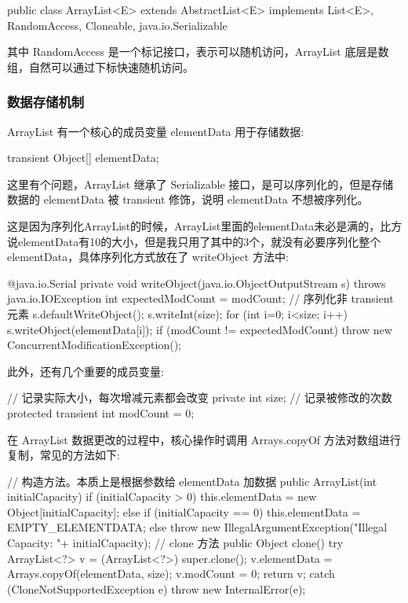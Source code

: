 \begin{Java}
public class ArrayList<E> extends AbstractList<E> implements List<E>, RandomAccess, Cloneable, java.io.Serializable
\end{Java}

其中 RandomAccess 是一个标记接口，表示可以随机访问，ArrayList 底层是数组，自然可以通过下标快速随机访问。

\subsubsection{数据存储机制}

ArrayList 有一个核心的成员变量 elementData 用于存储数据:

\begin{Java}
transient Object[] elementData;
\end{Java}

这里有个问题，ArrayList 继承了 Serializable 接口，是可以序列化的，但是存储数据的 elementData 被 transient 修饰，说明 elementData 不想被序列化。

这是因为序列化ArrayList的时候，ArrayList里面的elementData未必是满的，比方说elementData有10的大小，但是我只用了其中的3个，就没有必要序列化整个 elementData，具体序列化方式放在了 writeObject 方法中:

\begin{Java}
@java.io.Serial
private void writeObject(java.io.ObjectOutputStream s)
    throws java.io.IOException {
    int expectedModCount = modCount;
    // 序列化非 transient 元素
    s.defaultWriteObject();
    s.writeInt(size);
    for (int i=0; i<size; i++) {
        s.writeObject(elementData[i]);
    }
    if (modCount != expectedModCount) {
        throw new ConcurrentModificationException();
    }
}
\end{Java}

此外，还有几个重要的成员变量:

\begin{Java}
// 记录实际大小，每次增减元素都会改变
private int size;
// 记录被修改的次数
protected transient int modCount = 0;
\end{Java}
 
在 ArrayList 数据更改的过程中，核心操作时调用 Arrays.copyOf 方法对数组进行复制，常见的方法如下:

\begin{Java}
// 构造方法。本质上是根据参数给 elementData 加数据
public ArrayList(int initialCapacity) {
    if (initialCapacity > 0) {
        this.elementData = new Object[initialCapacity];
    } else if (initialCapacity == 0) {
        this.elementData = EMPTY_ELEMENTDATA;
    } else {
        throw new IllegalArgumentException("Illegal Capacity: "+ initialCapacity);
    }
}
// clone 方法
public Object clone() {
    try {
        ArrayList<?> v = (ArrayList<?>) super.clone();
        v.elementData = Arrays.copyOf(elementData, size);
        v.modCount = 0;
        return v;
    } catch (CloneNotSupportedException e) {
        throw new InternalError(e);
    }
}
\end{Java}

